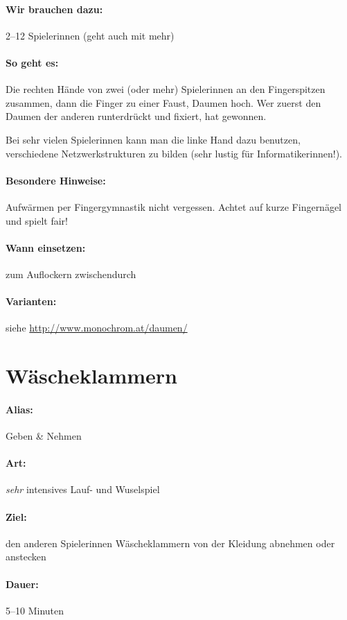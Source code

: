 \paragraph{Wir brauchen dazu:} 2--12 Spielerinnen (geht auch mit mehr)
\paragraph{So geht es:}
Die rechten Hände von zwei (oder mehr) Spielerinnen an den Fingerspitzen zusammen, dann die Finger zu einer Faust, Daumen hoch. Wer zuerst den Daumen der anderen runterdrückt und fixiert, hat gewonnen.

Bei sehr vielen Spielerinnen kann man die linke Hand dazu benutzen, verschiedene Netzwerkstrukturen zu bilden (sehr lustig für Informatikerinnen!).

\paragraph{Besondere Hinweise:} Aufwärmen per Fingergymnastik nicht vergessen. Achtet auf kurze Fingernägel und spielt fair!
\paragraph{Wann einsetzen:} zum Auflockern zwischendurch
\paragraph{Varianten:} siehe \url{http://www.monochrom.at/daumen/}


\section{Wäscheklammern}
\paragraph{Alias:} Geben \& Nehmen
\paragraph{Art:} \emph{sehr} intensives Lauf- und Wuselspiel
\paragraph{Ziel:} den anderen Spielerinnen Wäscheklammern von der Kleidung abnehmen oder anstecken
\paragraph{Dauer:} 5--10 Minuten
